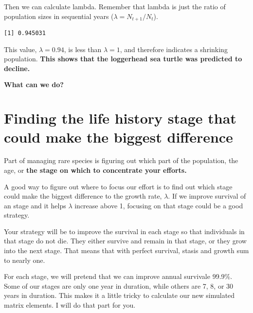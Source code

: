 \documentclass[
  letterpaper,
  DIV=11,
  numbers=noendperiod]{scrreprt}
\newenvironment{Shaded}{\begin{snugshade}}{\end{snugshade}}
\newcommand{\DecValTok}[1]{\textcolor[rgb]{0.68,0.00,0.00}{#1}}
\newcommand{\FunctionTok}[1]{\textcolor[rgb]{0.28,0.35,0.67}{#1}}
\newcommand{\NormalTok}[1]{\textcolor[rgb]{0.00,0.23,0.31}{#1}}
\newcommand{\OtherTok}[1]{\textcolor[rgb]{0.00,0.23,0.31}{#1}}
\newcommand{\SpecialCharTok}[1]{\textcolor[rgb]{0.37,0.37,0.37}{#1}}
\begin{document}
Then we can calculate lambda. Remember that lambda is just the ratio of
population sizes in sequential years (\(\lambda=N_{t+1}/N_{t}\)).

\begin{Shaded}
\end{Shaded}

\begin{verbatim}
[1] 0.945031
\end{verbatim}

This value, \(\lambda = 0.94\), is less than \(\lambda=1\), and
therefore indicates a shrinking population. \textbf{This shows that the
loggerhead sea turtle was predicted to decline.}

\textbf{What can we do?}

\section{Finding the life history stage that could make the biggest
difference}\label{finding-the-life-history-stage-that-could-make-the-biggest-difference}

Part of managing rare species is figuring out which part of the
population, the age, or \textbf{the stage on which to concentrate your
efforts.}

A good way to figure out where to focus our effort is to find out which
stage could make the biggest difference to the growth rate, \(\lambda\).
If we improve survival of an stage and it helps \(\lambda\) increase
above 1, focusing on that stage could be a good strategy.

Your strategy will be to improve the survival in each stage so that
individuals in that stage do not die. They either survive and remain in
that stage, or they grow into the next stage. That means that with
perfect survival, stasis and growth sum to nearly one.

For each stage, we will pretend that we can improve annual survivale
99.9\%. Some of our stages are only one year in duration, while others
are 7, 8, or 30 years in duration. This makes it a little tricky to
calculate our new simulated matrix elements. I will do that part for
you.
\end{document}

